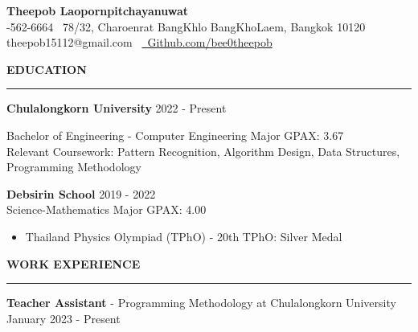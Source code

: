 \documentclass[11pt]{article}
\begin{document}
\begin{center}
    {\Large \textbf{Theepob Laopornpitchayanuwat}} \\
    -562-6664 \textbullet \ 78/32, Charoenrat BangKhlo BangKhoLaem, Bangkok 10120 \\
    theepob15112@gmail.com
    \textbullet\ \href{https://github.com/bee0theepob}{\faGithub\ Github.com/bee0theepob}
\end{center}
\textbf{EDUCATION}
\vspace{5pt}
{\color{NavyBlue}\hrule}
\vspace{6pt}

\textbf{Chulalongkorn University} \hfill 2022 - Present

\hspace*{7pt} Bachelor of Engineering - Computer Engineering Major GPAX: 3.67\\
\hspace*{7pt} Relevant Coursework: Pattern Recognition, Algorithm Design, Data Structures, Programming Methodology

\vspace{2pt}

\textbf{Debsirin School} \hfill 2019 - 2022\\
\hspace*{7pt} {Science-Mathematics Major GPAX: 4.00}

\begin{itemize}[noitemsep, topsep=0pt, partopsep=0pt, parsep=0pt]
    \item Thailand Physics Olympiad (TPhO) - 20th TPhO: Silver Medal

\end{itemize}

\vspace{9pt}
\textbf{WORK EXPERIENCE}
\vspace{5pt}
{\color{NavyBlue}\hrule}
\vspace{6pt}

\textbf{Teacher Assistant} - Programming Methodology at Chulalongkorn University \hfill January 2023 - Present
\end{document}
